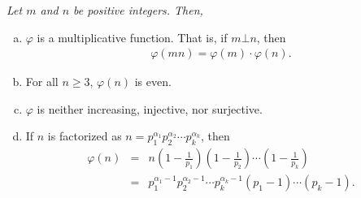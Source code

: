 \documentclass[12pt]{subfile}
\begin{document}
		\begin{theorem}\slshape\label{thm:phiproperties-ch:arith}
			Let $m$ and $n$ be positive integers. Then,
				\begin{enumerate}[(a)]
					\item $\varphi$ is a multiplicative function. That is, if $m \bot n$, then
						\begin{align*}
							\varphi(mn)=\varphi(m) \cdot \varphi (n).
						\end{align*}
					\item For all $n \geq 3$, $\varphi(n)$ is even.
					\item $\varphi$ is neither increasing, injective, nor surjective.
					\item If $n$ is factorized as $n= p_1^{\alpha_1} p_2^{\alpha_2} \cdots p_k^{\alpha_k}$, then
						\begin{eqnarray*}
							\varphi(n) & = & n \left( 1 - \frac{1}{p_1} \right)  \left( 1 - \frac{1}{p_2} \right)  \cdots \left( 1 - \frac{1}{p_k} \right)  \\
									   & = & p_1^{\alpha_1-1} p_2^{\alpha_2-1} \cdots p_k^{\alpha_k-1} \left( p_1 -1 \right) \cdots \left( p_k -1 \right).
						\end{eqnarray*}
				\end{enumerate}
		\end{theorem}
\end{document}
